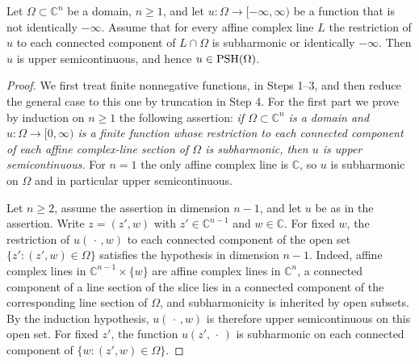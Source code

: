 \begin{theorem}\label{thm:automatic-psh-usc}
Let $\Omega\subset\mathbb{C}^n$ be a domain, $n\ge1$, and let $u\colon\Omega\to[-\infty,\infty)$ be a function that is not identically $-\infty$. Assume that for every affine complex line $L$ the restriction of $u$ to each connected component of $L\cap\Omega$ is subharmonic or identically $-\infty$. Then $u$ is upper semicontinuous, and hence $u\in\mathrm{PSH}(\Omega)$.
\end{theorem}
\begin{proof}
We first treat finite nonnegative functions, in Steps 1--3, and then reduce the general case to this one by truncation in Step 4. For the first part we prove by induction on $n\geq1$ the following assertion: \emph{if $\Omega\subset\mathbb{C}^n$ is a domain and $u\colon\Omega\to[0,\infty)$ is a finite function whose restriction to each connected component of each affine complex-line section of $\Omega$ is subharmonic, then $u$ is upper semicontinuous.} For $n=1$ the only affine complex line is $\mathbb{C}$, so $u$ is subharmonic on $\Omega$ and in particular upper semicontinuous.

Let $n\geq2$, assume the assertion in dimension $n-1$, and let $u$ be as in the assertion. Write $z=(z',w)$ with $z'\in\mathbb{C}^{n-1}$ and $w\in\mathbb{C}$. For fixed $w$, the restriction of $u(\,\cdot\,,w)$ to each connected component of the open set $\{z':(z',w)\in\Omega\}$ satisfies the hypothesis in dimension $n-1$. Indeed, affine complex lines in $\mathbb{C}^{n-1}\times\{w\}$ are affine complex lines in $\mathbb{C}^n$, a connected component of a line section of the slice lies in a connected component of the corresponding line section of $\Omega$, and subharmonicity is inherited by open subsets. By the induction hypothesis, $u(\,\cdot\,,w)$ is therefore upper semicontinuous on this open set. For fixed $z'$, the function $u(z',\,\cdot\,)$ is subharmonic on each connected component of $\{w:(z',w)\in\Omega\}$.


\end{proof}
